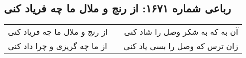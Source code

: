 \begin{center}
\section*{رباعی شماره ۱۶۷۱: از رنج و ملال ما چه فریاد کنی}
\label{sec:1671}
\begin{longtable}{l p{0.5cm} r}
از رنج و ملال ما چه فریاد کنی
&&
آن به که به شکر وصل را شاد کنی
\\
از ما چه گریزی و چرا داد کنی
&&
زان ترس که وصل را بسی یاد کنی
\\
\end{longtable}
\end{center}
